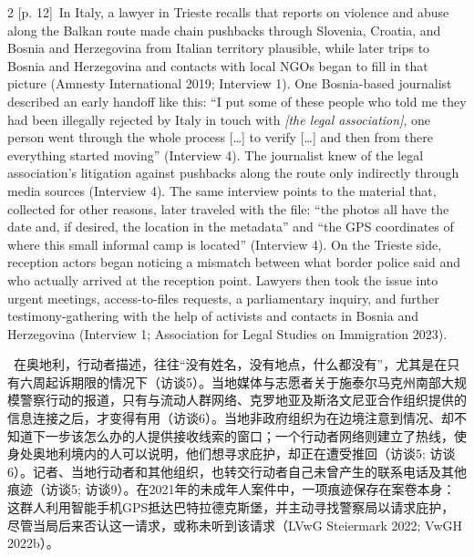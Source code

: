 \documentclass[10pt,a4paper]{article}
\begin{document}
\begin{paracol}{2}
\switchcolumn
{\scriptsize\color{gray} [p. 12]}\ In Italy, a lawyer in Trieste recalls that reports on violence and abuse along the Balkan route made chain pushbacks through Slovenia, Croatia, and Bosnia and Herzegovina from Italian territory plausible, while later trips to Bosnia and Herzegovina and contacts with local NGOs began to fill in that picture (Amnesty International 2019; Interview 1). One Bosnia-based journalist described an early handoff like this: “I put some of these people who told me they had been illegally rejected by Italy in touch with \textit{[the legal association]}, one person went through the whole process […] to verify […] and then from there everything started moving” (Interview 4). The journalist knew of the legal association’s litigation against pushbacks along the route only indirectly through media sources (Interview 4). The same interview points to the material that, collected for other reasons, later traveled with the file: “the photos all have the date and, if desired, the location in the metadata” and “the GPS coordinates of where this small informal camp is located” (Interview 4). On the Trieste side, reception actors began noticing a mismatch between what border police said and who actually arrived at the reception point. Lawyers then took the issue into urgent meetings, access-to-files requests, a parliamentary inquiry, and further testimony-gathering with the help of activists and contacts in Bosnia and Herzegovina (Interview 1; Association for Legal Studies on Immigration 2023).\par
\switchcolumn*
{\scriptsize\color{gray} [p. 12]}\ 在奥地利，行动者描述，往往“没有姓名，没有地点，什么都没有”，尤其是在只有六周起诉期限的情况下（访谈5）。当地媒体与志愿者关于施泰尔马克州南部大规模警察行动的报道，只有与流动人群网络、克罗地亚及斯洛文尼亚合作组织提供的信息连接之后，才变得有用（访谈6）。当地非政府组织为在边境注意到情况、却不知道下一步该怎么办的人提供接收线索的窗口；一个行动者网络则建立了热线，使身处奥地利境内的人可以说明，他们想寻求庇护，却正在遭受推回（访谈5; 访谈6）。记者、当地行动者和其他组织，也转交行动者自己未曾产生的联系电话及其他痕迹（访谈5; 访谈9）。在2021年的未成年人案件中，一项痕迹保存在案卷本身：这群人利用智能手机GPS抵达巴特拉德克斯堡，并主动寻找警察局以请求庇护，尽管当局后来否认这一请求，或称未听到该请求（LVwG Steiermark 2022; VwGH 2022b）。\par
\switchcolumn

\end{paracol}
\end{document}
